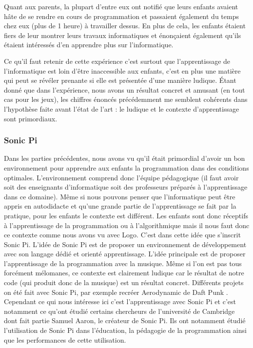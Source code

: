 Quant aux parents, la plupart d'entre eux ont notifié que leurs enfants avaient hâte de se rendre en cours de programmation et passaient également du temps chez eux (plus de 1 heure) à travailler dessus. En plus de cela, les enfants étaient fiers de leur montrer leurs travaux informatiques et énonçaient également qu'ils étaient intéressés d'en apprendre plus sur l'informatique.

Ce qu'il faut retenir de cette expérience c'est surtout que l'apprentissage de l'informatique est loin d'être inaccessible aux enfants, c'est en plus une matière qui peut se révéler prenante si elle est présentée d'une manière ludique. Étant donné que dans l'expérience, nous avons un résultat concret et amusant (en tout cas pour les jeux), les chiffres énoncés précédemment me semblent cohérents dans l'hypothèse faite avant l'état de l'art : le ludique et le contexte d'apprentissage sont primordiaux.

\subsubsection{Sonic Pi}

Dans les parties précédentes, nous avons vu qu'il était primordial d'avoir un bon environnement pour apprendre aux enfants la programmation dans des conditions optimales. L'environnement comprend donc l'équipe pédagogique (il faut avoir soit des enseignants d'informatique soit des professeurs préparés à l'apprentissage dans ce domaine). Même si nous pouvons penser que l'informatique peut être appris en autodidacte et qu'une grande partie de l'apprentissage se fait par la pratique, pour les enfants le contexte est différent. Les enfants sont donc réceptifs à l'apprentissage de la programmation ou à l'algorithmique mais il nous faut donc ce contexte comme nous avons vu avec Logo. C'est dans cette idée que s'inscrit Sonic Pi. L'idée de Sonic Pi est de proposer un environnement de développement avec son langage dédié et orienté apprentissage. L'idée principale est de proposer l'apprentissage de la programmation avec la musique. Même si l'on est pas tous forcément mélomanes, ce contexte est clairement ludique car le résultat de notre code (qui produit donc de la musique) est un résultat concret. Différents projets on été fait avec Sonic Pi, par exemple recréer Aerodynamic de Daft Punk \cite{18} . Cependant ce qui nous intéresse ici c'est l'apprentissage avec Sonic Pi et c'est notamment ce qu'ont étudié certains chercheurs de l'université de Cambridge dont fait partie Samuel Aaron, le créateur de Sonic Pi. Ils ont notamment étudié l'utilisation de Sonic Pi dans l'éducation, la pédagogie de la programmation ainsi que les performances de cette utilisation. \cite{19} \cite{20}

